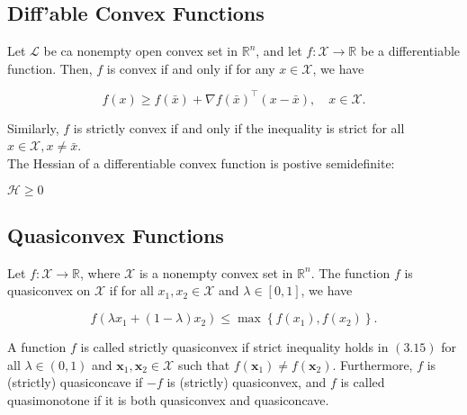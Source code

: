 \documentclass[english]{latex4ei_sheet}
\begin{document}
\begin{sectionbox}
\subsection{Diff'able Convex Functions}
Let $\mathcal{L}$ be ca nonempty open convex set in $\mathbb{R}^{n}$, and let $f: \mathcal{X} \rightarrow \mathbb{R}$ be a differentiable function. Then, $f$ is convex if and only if for any $x \in \mathcal{X}$, we have
\begin{emphbox}
\begin{flushleft}
$$
f(x) \geq f(\bar{x})+\nabla f(\bar{x})^{\top}(x-\bar{x}), \quad x \in \mathcal{X} .
$$
\end{flushleft}
\end{emphbox}

Similarly, $f$ is strictly convex if and only if the inequality is strict for all $x \in \mathcal{X}, x \neq \bar{x}$.\\
The Hessian of a differentiable convex function is postive semidefinite:
\begin{emphbox}
$\mathcal{H} \geq 0$
\end{emphbox}
\end{sectionbox}
\begin{sectionbox}
\subsection{Quasiconvex Functions}
Let $f: \mathcal{X} \rightarrow \mathbb{R}$, where $\mathcal{X}$ is a nonempty convex set in $\mathbb{R}^{n}$. The function $f$ is quasiconvex on $\mathcal{X}$ if for all $x_{1}, x_{2} \in \mathcal{X}$ and $\lambda \in[0,1]$, we have
\begin{emphbox}
$$
f\left(\lambda x_{1}+(1-\lambda) x_{2}\right) \leq \max \left\{f\left(x_{1}\right), f\left(x_{2}\right)\right\} .
$$
\end{emphbox}

A function $f$ is called strictly quasiconvex if strict inequality holds in $(3.15)$ for all $\lambda \in(0,1)$ and $\boldsymbol{x}_{1}, \boldsymbol{x}_{2} \in \mathcal{X}$ such that $f\left(\boldsymbol{x}_{1}\right) \neq f\left(\boldsymbol{x}_{2}\right)$. Furthermore, $f$ is (strictly) quasiconcave if $-f$ is (strictly) quasiconvex, and $f$ is called quasimonotone if it is both quasiconvex and quasiconcave.
\end{sectionbox}
\end{document}
